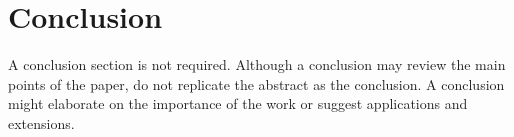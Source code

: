 \documentclass[journal]{IEEEtran}
\begin{document}
\section{Conclusion}

A conclusion section is not required. Although a conclusion may review the main points of the paper, do not replicate the abstract as the conclusion. A conclusion might elaborate on the importance of the work or suggest applications and extensions. 

\newpage


\end{document}
